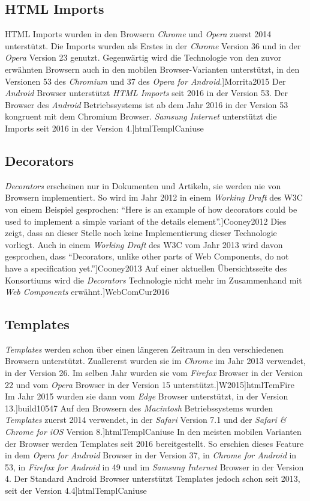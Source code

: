 \documentclass[12pt, paper=a4, bibtotoc, toc=listof, headsepline=true]{scrreprt}
\renewcommand{\smfootcite}[2][2]{\relax}
\begin{document}
		\subsection{HTML Imports}
		HTML Imports wurden in den Browsern \emph{Chrome} und \emph{Opera} zuerst 2014 unterstützt. Die Imports wurden als Erstes in der \emph{Chrome} Version 36 und in der \emph{Opera} Version 23 genutzt. Gegenwärtig wird die Technologie von den zuvor erwähnten Browsern auch in den mobilen Browser-Varianten unterstützt, in den Versionen 53 des \emph{Chromium} und 37 des \emph{Opera for Android}.\smfootcite[ vgl.][]{Morrita2015} Der \emph{Android} Browser unterstützt \emph{HTML Imports} seit 2016 in der Version 53. Der Browser des \emph{Android} Betriebssystems ist ab dem Jahr 2016 in der Version 53 kongruent mit dem Chromium Browser. \emph{Samsung Internet} unterstützt die Imports seit 2016 in der Version 4.\smfootcite[ vgl.][]{htmlTemplCaniuse}
		\subsection{Decorators}
		\emph{Decorators} erscheinen nur in Dokumenten und Artikeln, sie werden nie von Browsern implementiert. So wird im Jahr 2012 in einem \emph{Working Draft} des \ac{W3C} von einem Beispiel gesprochen: \enquote{Here is an example of how decorators could be used to implement a simple variant of the details element}.\smfootcite[ ][]{Cooney2012} Dies zeigt, dass an dieser Stelle noch keine Implementierung dieser Technologie vorliegt. Auch in einem \emph{Working Draft} des \ac{W3C} vom Jahr 2013 wird davon gesprochen, dass \enquote{Decorators, unlike other parts of Web Components, do not have a specification yet.}\smfootcite[][]{Cooney2013}
		Auf einer aktuellen Übersichtsseite des Konsortiums wird die \emph{Decorators} Technologie nicht mehr im Zusammenhand mit \emph{Web Components} erwähnt.\smfootcite[ vgl.][]{WebComCur2016}
		\subsection{Templates}
		\emph{Templates} werden schon über einen längeren Zeitraum in den verschiedenen Browsern unterstützt. Zuallererst wurden sie im \emph{Chrome} im Jahr 2013 verwendet, in der Version 26. Im selben Jahr wurden sie vom \emph{Firefox} Browser in der Version 22 und vom \emph{Opera} Browser in der Version 15 unterstützt.\smfootcite[ vgl.][]{W2015}\smfootcite[ vgl.][]{htmlTemFire}
		Im Jahr 2015 wurden sie dann vom \emph{Edge} Browser unterstützt, in der Version 13.\smfootcite[ vgl.][]{build10547}
		Auf den Browsern des \emph{Macintosh} Betriebssystems wurden \emph{Templates} zuerst 2014 verwendet, in der \emph{Safari} Version 7.1 und der \emph{Safari \& Chrome for iOS} Version 8.\smfootcite[ vgl.][]{htmlTemplCaniuse} In den meisten mobilen Varianten der Browser werden Templates seit 2016 bereitgestellt. So erschien dieses Feature in dem \emph{Opera for Android} Browser in der Version 37, in \emph{Chrome for Android} in 53, in \emph{Firefox for Android} in 49 und im \emph{Samsung Internet} Browser in der Version 4. Der Standard Android Browser unterstützt Templates jedoch schon seit 2013, seit der Version 4.4\smfootcite[ vgl.][]{htmlTemplCaniuse}
\end{document}

